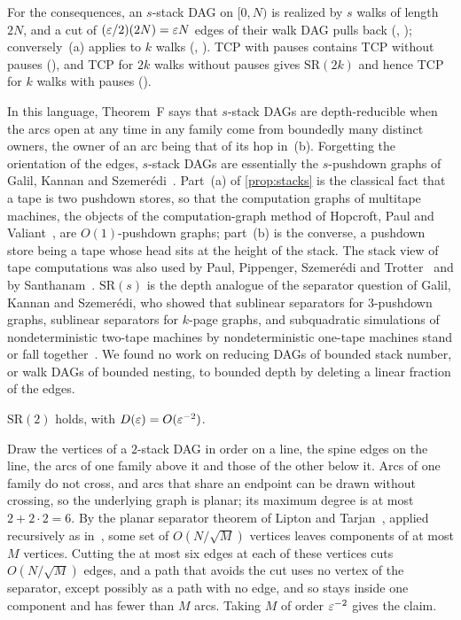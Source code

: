 \begin{outline}
For the consequences, an $s$-stack DAG on $[0,N)$ is realized by $s$ walks of length $2N$, and a cut of
$(\varepsilon/2)(2N)=\varepsilon N$ edges of their walk DAG pulls back (, ); conversely~(a)
applies to $k$ walks (, ). TCP with pauses contains TCP without pauses
(), and TCP for $2k$ walks without pauses gives $\mathrm{SR}(2k)$ and hence TCP for $k$ walks with pauses
().
\end{outline}

In this language, Theorem~F says that $s$-stack DAGs are depth-reducible when the arcs open at any time in any family come
from boundedly many distinct owners, the owner of an arc being that of its hop in~(b). Forgetting the orientation of the
edges, $s$-stack DAGs are essentially the $s$-pushdown graphs of Galil, Kannan and Szemerédi~\cite{GKS1989separators}. Part~(a) of \cref{prop:stacks} is the
classical fact that a tape is two pushdown stores, so that the computation graphs of multitape machines, the objects of the
computation-graph method of Hopcroft, Paul and Valiant~\cite{HPV1977}, are $O(1)$-pushdown graphs; part~(b) is the converse,
a pushdown store being a tape whose head sits at the height of the stack. The stack view of tape computations was also used
by Paul, Pippenger, Szemerédi and Trotter~\cite{PPST1983} and by Santhanam~\cite{Santhanam2001}. $\mathrm{SR}(s)$ is the
depth analogue of the separator question of Galil, Kannan and Szemerédi, who showed that sublinear separators for
$3$-pushdown graphs, sublinear separators for $k$-page graphs, and subquadratic simulations of nondeterministic two-tape machines
by nondeterministic one-tape machines stand or fall together~\cite{GKS1989separators}. We found no work on reducing DAGs of bounded stack number, or walk DAGs
of bounded nesting, to bounded depth by deleting a linear fraction of the edges.

\begin{proposition}\label{prop:sr2}
\notformalized
$\mathrm{SR}(2)$ holds, with $D(\varepsilon)=O(\varepsilon^{-2})$.
\end{proposition}

\begin{informalproof}
Draw the vertices of a $2$-stack DAG in order on a line, the spine edges on the line, the arcs of one family above it and
those of the other below it. Arcs of one family do not cross, and arcs that share an endpoint can be drawn without
crossing, so the underlying graph is planar; its maximum degree is at most $2+2\cdot2=6$. By the planar separator theorem of
Lipton and Tarjan~\cite{LiptonTarjan1979}, applied recursively as in~\cite{LiptonTarjan1980}, some set of $O(N/\sqrt M)$
vertices leaves components of at most $M$ vertices. Cutting the at most six edges at each of these vertices cuts
$O(N/\sqrt M)$ edges, and a path that avoids the cut uses no vertex of the separator, except possibly as a path with no edge,
and so stays inside one component and has fewer than $M$ arcs. Taking $M$ of order $\varepsilon^{-2}$ gives the claim.
\end{informalproof}

